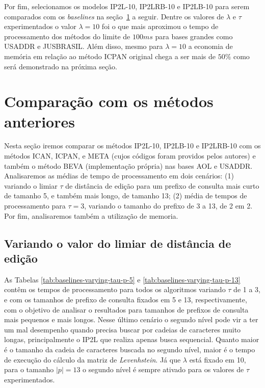 Por fim, selecionamos os modelos IP2L-10, IP2LRB-10 e IP2LB-10 para serem comparados com os \textit{baselines} na seção~\ref{sec:comparison_baseline_methods} a seguir. Dentre os valores de $\lambda$ e $\tau$ experimentados o valor $\lambda=10$ foi o que mais aproximou o tempo de processamento dos métodos do limite de $100ms$ para bases grandes como USADDR e JUSBRASIL. Além disso, mesmo para $\lambda=10$ a economia de memória em relação ao método ICPAN original chega a ser mais de $50\%$ como será demonstrado na próxima seção.


\section{Comparação com os métodos anteriores}
\label{sec:comparison_baseline_methods}

Nesta seção iremos comparar os métodos IP2L-10, IP2LB-10 e IP2LRB-10 com os métodos ICAN, ICPAN, e META (cujos códigos foram providos pelos autores) e também o método BEVA (implementação própria) nas bases AOL e USADDR. Analisaremos as médias de tempo de processamento em dois cenários: (1) variando o limiar $\tau$ de distância de edição para um prefixo de consulta mais curto de tamanho 5, e também mais longo, de tamanho 13; (2) média de tempos de processamento para $\tau=3$, variando o tamanho do prefixo de 3 a 13, de 2 em 2. Por fim, analisaremos também a utilização de memoria.

\subsection{Variando o valor do limiar de distância de edição}

As Tabelas \ref{tab:baselines-varying-tau-p-5} e \ref{tab:baselines-varying-tau-p-13} contêm os tempos de processamento para todos os algoritmos variando $\tau$ de 1 a 3, e com os tamanhos de prefixo de consulta fixados em 5 e 13, respectivamente, com o objetivo de analisar o resultados para tamanhos de prefixos de consulta mais pequenos e mais longos. Nesse último cenário o segundo nível pode vir a ter um mal desempenho quando precisa buscar por cadeias de caracteres muito longas, principalmente o IP2L que realiza apenas busca sequencial. Quanto maior é o tamanho da cadeia de caracteres buscada no segundo nível, maior é o tempo de execução do cálculo da matriz de \textit{Levenhstein}. Já que $\lambda$ está fixado em 10, para o tamanho $|p|=13$ o segundo nível é sempre ativado para os valores de $\tau$ experimentados.

